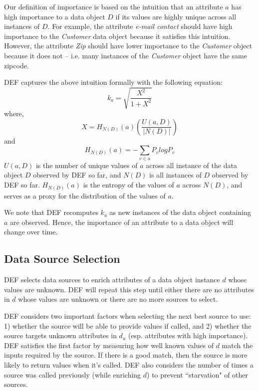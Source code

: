 Our definition of importance is based on the intuition that an attribute $a$ has high importance to a data object
$D$ if its values are highly unique across all instances of $D$. For example, the attribute {\it e-mail contact} 
should have high importance to the {\it Customer} data object because it satisfies this intuition. However, 
the attribute {\it Zip} should have lower importance to the {\it Customer} object because it does not -- i.e. 
many instances of the {\it Customer} object have the same zipcode.

DEF captures the above intuition formally with the following equation:
\begin{equation}
	k_a= \sqrt{\frac{X^2}{1+ X^2}}
\end{equation}
where, 
\begin{equation}
	X = H_{N(D)}(a) \left(\frac{U(a,D)}{|N(D)|}\right)
\end{equation}
and
\begin{equation}
	H_{N(D)}(a)= - \displaystyle\sum\limits_{v \in a} P_v log P_v
\end{equation}
$U(a,D)$ is the number of unique values of $a$ across all instance of the data object $D$ observed by 
DEF so far, and $N(D)$ is all instances of $D$ observed by DEF so far. $H_{N(D)}(a)$ is the entropy of 
the values of $a$ across $N(D)$, and serves as a proxy for the distribution of the values of $a$. 

We note that DEF recomputes $k_a$ as new instances of the data object containing $a$ are observed. Hence, 
the importance of an attribute to a data object will change over time.


\subsection{Data Source Selection} 

DEF selects data sources to enrich attributes of a data object instance $d$ whose values are unknown. 
DEF will repeat this step until either there are no attributes in $d$ whose values are unknown or there 
are no more sources to select.

DEF considers two important factors when selecting the next best source to use: 1) whether the source will 
be able to provide values if called, and 2) whether the source targets unknown attributes in $d_u$ (esp.
attributes with high importance). DEF satisfies the first factor by measuring how well known values of $d$ 
match the inputs required by the source. If there is a good match, then the source is more likely to return 
values when it's called. DEF also considers the number of times a source was called previously (while enriching 
$d$) to prevent ``starvation" of other sources. 


